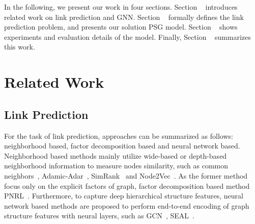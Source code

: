 \documentclass[sigconf]{acmart}
\begin{document}
In the following, we present our work in four sections. Section ~ introduces related work on link prediction and GNN. Section ~ formally defines the link prediction problem, and presents our solution PSG model. Section ~ shows experiments and evaluation details of the model. Finally, Section ~ summarizes this work.

\section{Related Work} \label{section_relatedwork}
\subsection{Link Prediction} For the task of link prediction,  approaches can be summarized as follows: neighborhood based, factor decomposition based and neural network based. Neighborhood based methods mainly utilize wide-based or depth-based neighborhood information to measure nodes similarity, such as common neighbors~\cite{liben2007link},  Adamic-Adar~\cite{adamic2003friends}, SimRank~\cite{jeh2002simrank} and Node2Vec~\cite{grover2016node2vec}. As the former method focus only on the explicit factors of graph, factor decomposition based method PNRL~\cite{wang2017predictive}. Furthermore, to capture deep hierarchical structure features, neural network based methods are proposed to perform end-to-end encoding of graph structure features with neural layers, such as GCN~\cite{kipf2016semi}, SEAL~\cite{zhang2018link}. 
\end{document}
